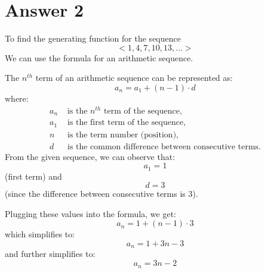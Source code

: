 \documentclass[12pt]{article}
\begin{document}
\section*{Answer 2}

To find the generating function for the sequence
\[ <1, 4, 7, 10, 13, \ldots >\]
We can use the formula for an arithmetic sequence.

The \( n^{th} \) term of an arithmetic sequence can be represented as:
\[ a_n = a_1 + (n - 1) \cdot d \]
where:
\begin{align*}
a_n & \text{ is the } n^{th} \text{ term of the sequence}, \\
a_1 & \text{ is the first term of the sequence}, \\
n & \text{ is the term number (position)}, \\
d & \text{ is the common difference between consecutive terms}.
\end{align*}
From the given sequence, we can observe that:
\[ a_1 = 1 \] (first term)
and
\[ d = 3 \] (since the difference between consecutive terms is 3).

Plugging these values into the formula, we get:
\[ a_n = 1 + (n - 1) \cdot 3 \]
which simplifies to:
\[ a_n = 1 + 3n - 3 \]
and further simplifies to:
\[ a_n = 3n - 2 \]
\end{document}
